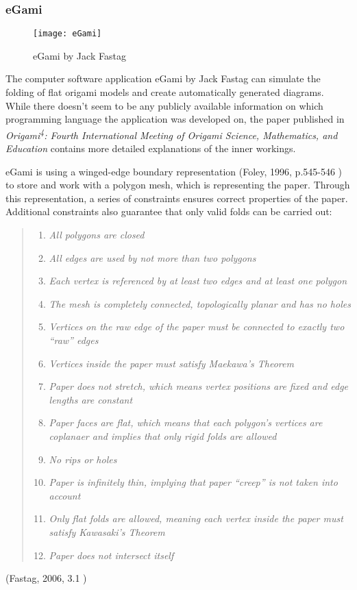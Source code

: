 \newpage
\subsubsection{eGami}
\label {eGami}
 \begin{figure}[htbp]
	\centering
	\texttt{[image: eGami]}
	\caption{eGami by Jack Fastag}
	\label{fig:eGami}
\end{figure}
\noindent The computer software application eGami \cite{eGami} by Jack Fastag can simulate the folding of flat origami models and create automatically generated diagrams. While there doesn't seem to be any publicly available information on which programming language the application was developed on, the paper published in \emph{Origami\textsuperscript{4}: Fourth International Meeting of Origami Science, Mathematics, and Education} contains more detailed explanations of the inner workings.

eGami is using a winged-edge boundary representation (Foley, 1996, p.545-546 \cite{wingedEdge}) to store and work with a polygon mesh, which is representing the paper. Through this representation, a series of constraints ensures correct properties of the paper. Additional constraints also guarantee that only valid folds can be carried out:

\blockquote{\begin{enumerate}[label=(\alph*)]
\item{\emph{All polygons are closed}}
\item{\emph{All edges are used by not more than two polygons}}
\item{\emph{Each vertex is referenced by at least two edges and at least one polygon}}
\item{\emph{The mesh is completely connected, topologically planar and has no holes}}
\item{\emph{Vertices on the raw edge of the paper must be connected to exactly two ``raw'' edges}}
\item{\emph{Vertices inside the paper must satisfy Maekawa's Theorem}}
\item{\emph{Paper does not stretch, which means vertex positions are fixed and edge lengths are constant}}
\item{\emph{Paper faces are flat, which means that each polygon's vertices are coplanaer and implies that only rigid folds are allowed}}
\item{\emph{No rips or holes}}
\item{\emph{Paper is infinitely thin, implying that paper ``creep'' is not taken into account}}
\item{\emph{Only flat folds are allowed, meaning each vertex inside the paper must satisfy Kawasaki's Theorem}}
\item{\emph{Paper does not intersect itself}}
\end{enumerate}}(Fastag, 2006, 3.1 \cite{eGami})
\onehalfspacing

